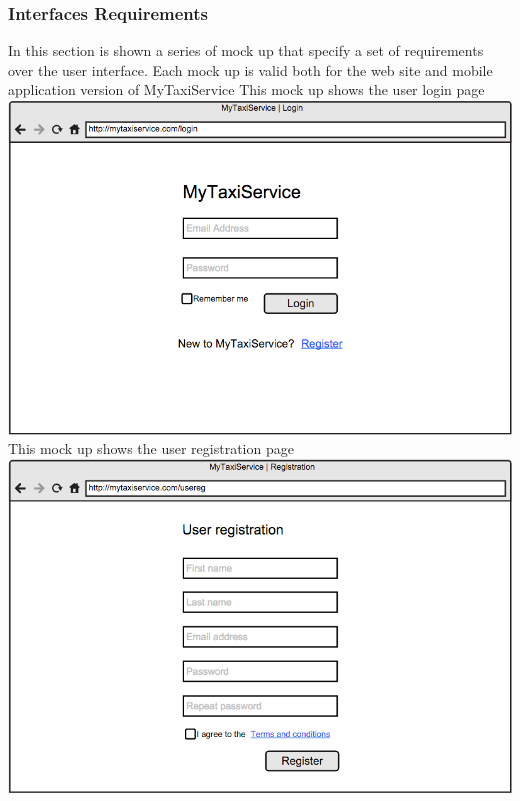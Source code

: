 \documentclass[11pt,titlepage]{article} %
\begin{document}
      \subsubsection{Interfaces Requirements}
       In this section is shown a series of mock up that specify a set of requirements over the user interface.\newline
       Each mock up is valid both for the web site and mobile application version of MyTaxiService\newline 
        \newline
        This mock up shows the user login page\newline
       \newline
        \includegraphics[scale=0.52]{loginInt.png}\newline
        \newpage
        \noindent
        This  mock up shows the user registration page\newline
	\newline
        \includegraphics[scale=0.52]{userRegInt.png}\newline
\end{document}
